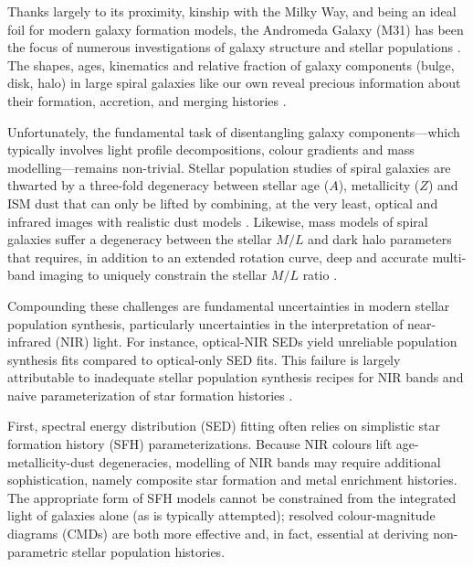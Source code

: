 \documentclass[iop]{emulateapj}
\newcommand{\eg}{\textit{e.g.,~}}
\begin{document}
Thanks largely to its proximity, kinship with the Milky Way, and being an ideal foil for modern galaxy formation models, the Andromeda Galaxy (M31) has been the focus of numerous investigations of galaxy structure \citep{Ibata:2005,Irwin:2005,McConnachie:2009,Courteau:2011} and stellar populations \citep{Williams:2002,Worthey:2005,Saglia:2010}.
The shapes, ages, kinematics and relative fraction of galaxy components (bulge, disk, halo) in large spiral galaxies like our own reveal precious information about their formation, accretion, and merging histories \citep[\eg see the review of][]{Kormendy:2004}.

Unfortunately, the fundamental task of disentangling galaxy components---which typically involves light profile decompositions, colour gradients and mass modelling---remains non-trivial.
Stellar population studies of spiral galaxies are thwarted by a three-fold degeneracy between stellar age ($A$), metallicity ($Z$) and ISM dust that can only be lifted by combining, at the very least, optical and infrared images with realistic dust models \citep{de-Jong:1996b,MacArthur:2004,Pforr:2012}.
Likewise, mass models of spiral galaxies suffer a degeneracy between the stellar $M/L$ and dark halo parameters that requires, in addition to an extended rotation curve, deep and accurate multi-band imaging to uniquely constrain the stellar $M/L$ ratio \citep{Dutton:2005,Courteau:2013}. 

Compounding these challenges are fundamental uncertainties in modern stellar population synthesis, particularly uncertainties in the interpretation of near-infrared (NIR) light.
For instance, optical-NIR SEDs yield unreliable population synthesis fits compared to optical-only SED fits.
This failure is largely attributable to inadequate stellar population synthesis recipes for NIR bands and naive parameterization of star formation histories \citep{Taylor:2011,Courteau:2013}.

First, spectral energy distribution (SED) fitting often relies on simplistic star formation history (SFH) parameterizations.
Because NIR colours lift age-metallicity-dust degeneracies, modelling of NIR bands may require additional sophistication, namely composite star formation and metal enrichment histories.
The appropriate form of SFH models cannot be constrained from the integrated light of galaxies alone (as is typically attempted); resolved colour-magnitude diagrams (CMDs) are both more effective and, in fact, essential at deriving non-parametric stellar population histories. 
\end{document}
